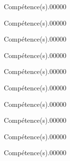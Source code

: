 \documentclass[a4paper,dvipsnames,french,10pt]{book}
\begin{document}

\begin{pageParcoursd} %

\begin{ExoCdN}{Compétence(s).}{0}{0}{0}{0}{0}

\end{ExoCdN}

\begin{ExoCdN}{Compétence(s).}{0}{0}{0}{0}{0}

\end{ExoCdN}

\begin{ExoCdN}{Compétence(s).}{0}{0}{0}{0}{0}

\end{ExoCdN}

\begin{ExoCdN}{Compétence(s).}{0}{0}{0}{0}{0}

\end{ExoCdN}

\begin{ExoCdN}{Compétence(s).}{0}{0}{0}{0}{0}

\end{ExoCdN}

\end{pageParcoursd} %


\begin{pageParcourst} %

\begin{ExoCtN}{Compétence(s).}{0}{0}{0}{0}{0}

\end{ExoCtN}

\begin{ExoCtN}{Compétence(s).}{0}{0}{0}{0}{0}

\end{ExoCtN}

\begin{ExoCtN}{Compétence(s).}{0}{0}{0}{0}{0}

\end{ExoCtN}

\begin{ExoCtN}{Compétence(s).}{0}{0}{0}{0}{0}

\end{ExoCtN}

\begin{ExoCtN}{Compétence(s).}{0}{0}{0}{0}{0}

\end{ExoCtN}

\end{pageParcourst} %
\end{document}

